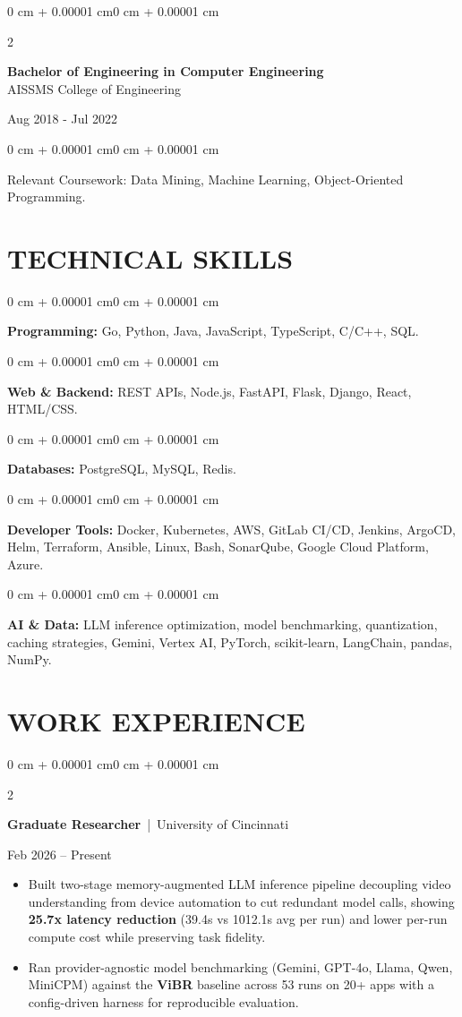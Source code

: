 \documentclass[10pt, letterpaper]{article}
\newenvironment{highlights}{
    \begin{itemize}[
        topsep=0.10 cm,
        parsep=0.06 cm,
        partopsep=0pt,
        itemsep=0.06 cm,
        leftmargin=12pt
    ]
}{
    \end{itemize}
}
\newenvironment{onecolentry}{
    \begin{adjustwidth}{0 cm + 0.00001 cm}{0 cm + 0.00001 cm}
}{
    \end{adjustwidth}
}
\newenvironment{twocolentry}[2][]{
    \onecolentry
    \def\secondColumn{#2}
    \setcolumnwidth{\fill, 4.5 cm}
    \begin{paracol}{2}
}{
    \switchcolumn \raggedleft \secondColumn
    \end{paracol}
    \endonecolentry
}
\begin{document}
\begin{twocolentry}{
    Aug 2018 - Jul 2022
}
    \textbf{Bachelor of Engineering in Computer Engineering} \\
    AISSMS College of Engineering
\end{twocolentry}
\begin{onecolentry}
Relevant Coursework: Data Mining, Machine Learning, Object-Oriented Programming.
\end{onecolentry}
\section{TECHNICAL SKILLS}
\begin{onecolentry}
\textbf{Programming:} Go, Python, Java, JavaScript, TypeScript, C/C++, SQL.
\end{onecolentry}
\vspace{0.06 cm}
\begin{onecolentry}
\textbf{Web \& Backend:} REST APIs, Node.js, FastAPI, Flask, Django, React, HTML/CSS.
\end{onecolentry}
\vspace{0.06 cm}
\begin{onecolentry}
\textbf{Databases:} PostgreSQL, MySQL, Redis.
\end{onecolentry}
\vspace{0.06 cm}
\begin{onecolentry}
\textbf{Developer Tools:} Docker, Kubernetes, AWS, GitLab CI/CD, Jenkins, ArgoCD, Helm, Terraform, Ansible, Linux, Bash, SonarQube, Google Cloud Platform, Azure.
\end{onecolentry}
\vspace{0.06 cm}
\begin{onecolentry}
\textbf{AI \& Data:} LLM inference optimization, model benchmarking, quantization, caching strategies, Gemini, Vertex AI, PyTorch, scikit-learn, LangChain, pandas, NumPy.
\end{onecolentry}

\section{WORK EXPERIENCE}
\begin{twocolentry}{Feb 2026 -- Present}
\textbf{Graduate Researcher} \,|\, University of Cincinnati
\end{twocolentry}
\begin{highlights}
  \item Built two-stage memory-augmented LLM inference pipeline decoupling video understanding from device automation to cut redundant model calls, showing \textbf{25.7x latency reduction} (39.4s vs 1012.1s avg per run) and lower per-run compute cost while preserving task fidelity.
  \item Ran provider-agnostic model benchmarking (Gemini, GPT-4o, Llama, Qwen, MiniCPM) against the \textbf{ViBR} baseline across 53 runs on 20+ apps with a config-driven harness for reproducible evaluation.
\end{highlights}
\end{document}
